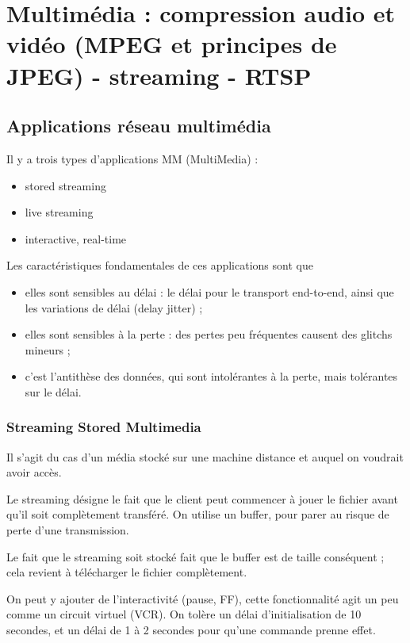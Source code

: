 \chapter{Multimédia : compression audio et vidéo (MPEG et principes de JPEG) - streaming - RTSP}

\section{Applications réseau multimédia}
	
	Il y a trois types d'applications MM (MultiMedia) :
	
	\begin{itemize}
		\item stored streaming
		\item live streaming
		\item interactive, real-time
	\end{itemize}
	
	Les caractéristiques fondamentales de ces applications sont que
	
	\begin{itemize}
		\item elles sont sensibles au délai : le délai pour le transport end-to-end, ainsi que les variations de délai (delay jitter) ;
		\item elles sont sensibles à la perte : des pertes peu fréquentes causent des glitchs mineurs ;
		\item c'est l'antithèse des données, qui sont intolérantes à la perte, mais tolérantes sur le délai.
	\end{itemize}
	
		\subsection{Streaming Stored Multimedia}
	
		Il s'agit du cas d'un média stocké sur une machine distance et auquel on voudrait avoir accès.
		
		Le streaming désigne le fait que le client peut commencer à jouer le fichier avant qu'il soit complètement transféré. On utilise un buffer, pour parer au risque de perte d'une transmission.
		
		Le fait que le streaming soit stocké fait que le buffer est de taille conséquent ; cela revient à télécharger le fichier complètement.
		
		
		On peut y ajouter de l'interactivité (pause, FF), cette fonctionnalité agit un peu comme un circuit virtuel (VCR). On tolère un délai d'initialisation de 10 secondes, et un délai de 1 à 2 secondes pour qu'une commande prenne effet.
		
